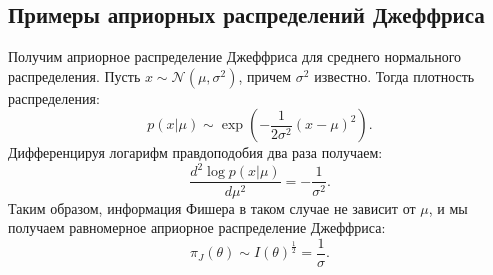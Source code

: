 \subsection{Примеры априорных распределений Джеффриса}
\begin{example}
Получим априорное распределение Джеффриса для среднего нормального распределения.
Пусть $x \sim \mathcal{N}(\mu, \sigma^2)$, причем $\sigma^2$ известно.
Тогда плотность распределения:
\[
p(x | \mu) \sim \exp \left(- \frac{1}{2 \sigma^2} (x - \mu)^2 \right).
\]
Дифференцируя логарифм правдоподобия два раза получаем:
\[
\frac{d^2 \log p(x | \mu)}{d \mu^2} = -\frac{1}{\sigma^2}.
\]
Таким образом, информация Фишера в таком случае не зависит от $\mu$, и мы получаем равномерное априорное распределение Джеффриса:
\[
\pi_J(\theta) \sim I(\theta)^{\frac12} = \frac{1}{\sigma}.
\]
\end{example}

